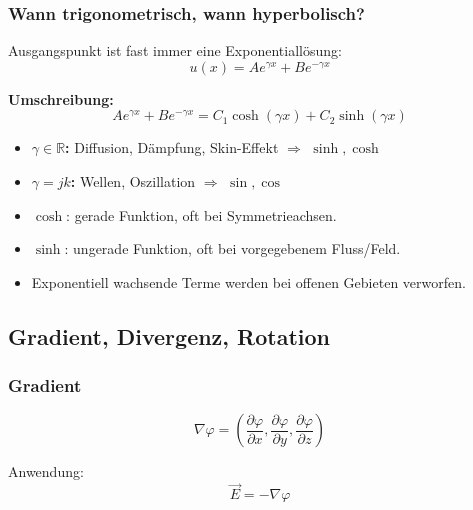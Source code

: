 \documentclass[a4paper]{article}
\newcommand{\imp}[1]{{\color{accent}\bfseries #1}}
\newcommand{\E}{\vec E}
\begin{document}
\subsubsection{Wann trigonometrisch, wann hyperbolisch?}

\begin{schema}
Ausgangspunkt ist fast immer eine Exponentiallösung:
\[
u(x)=Ae^{\gamma x}+Be^{-\gamma x}
\]
\end{schema}

\begin{schema}
\imp{Umschreibung:}
\[
Ae^{\gamma x}+Be^{-\gamma x}
=
C_1\cosh(\gamma x)+C_2\sinh(\gamma x)
\]
\end{schema}

\begin{checkitem}
\begin{itemize}
  \item \imp{$\gamma \in \mathbb{R}$:} Diffusion, Dämpfung, Skin-Effekt  
        $\Rightarrow$ \(\sinh,\cosh\)
  \item \imp{$\gamma = jk$:} Wellen, Oszillation  
        $\Rightarrow$ \(\sin,\cos\)
\end{itemize}
\end{checkitem}

\begin{merke}
\begin{itemize}
  \item \(\cosh\): gerade Funktion, oft bei Symmetrieachsen.
  \item \(\sinh\): ungerade Funktion, oft bei vorgegebenem Fluss/Feld.
  \item Exponentiell wachsende Terme werden bei offenen Gebieten verworfen.
\end{itemize}
\end{merke}
\subsection{Gradient, Divergenz, Rotation}

\subsubsection{Gradient}

\[
\nabla \varphi =
\left(
\frac{\partial\varphi}{\partial x},
\frac{\partial\varphi}{\partial y},
\frac{\partial\varphi}{\partial z}
\right)
\]

Anwendung:
\[
\E=-\nabla\varphi
\]
\end{document}
